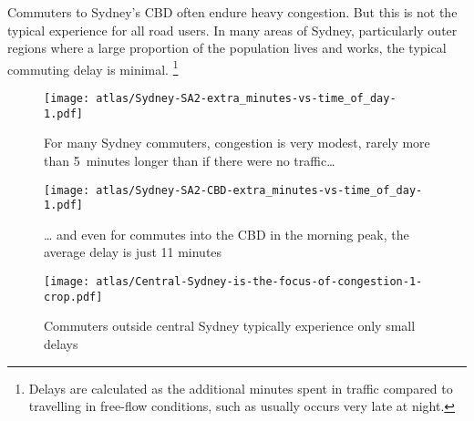 \documentclass{grattan}
\begin{document}
Commuters to Sydney's CBD often endure heavy congestion. But this is not the typical experience for all road users. In many areas of Sydney, particularly outer regions where a large proportion of the population lives and works, the typical commuting delay is minimal.%
    \footnote{Delays are calculated as the additional minutes spent in traffic compared to travelling in free-flow conditions, such as usually occurs very late at night.}

\begin{figure}
\caption{For many Sydney commuters, congestion is very modest, rarely more than 5~minutes longer than if there were no traffic\dots{}\label{fig:congestion-not-significant-for-many-users}}
\texttt{[image: atlas/Sydney-SA2-extra\_minutes-vs-time\_of\_day-1.pdf]}
%
\end{figure}

\begin{figure}
\caption{\dots{} and even for commutes into the CBD in the morning peak, the average delay is just 11 minutes\label{fig:weighted-cbd-commuting-delay-sydney}}
\texttt{[image: atlas/Sydney-SA2-CBD-extra\_minutes-vs-time\_of\_day-1.pdf]}
%
\end{figure}

\begin{figure*}
\caption{Commuters outside central Sydney typically experience only small delays \label{fig:map-Sydney-sa2-commuting-congestion-minutes}}
\texttt{[image: atlas/Central-Sydney-is-the-focus-of-congestion-1-crop.pdf]}
\end{figure*}
\end{document}
